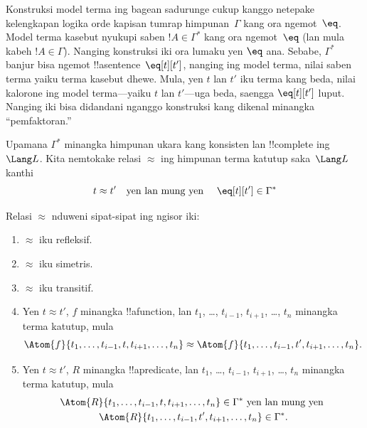 \documentclass[../../../include/open-logic-section]{subfiles}
\begin{document}

\begin{explain}
Konstruksi model terma ing bagean sadurunge cukup kanggo netepake
kelengkapan logika orde kapisan tumrap himpunan~$\Gamma$ kang ora
ngemot~$\eq$. Model terma kasebut nyukupi saben $!A \in \Gamma^*$ kang
ora ngemot~$\eq$ (lan mula kabeh $!A \in \Gamma$). Nanging konstruksi
iki ora lumaku yen $\eq$ ana. Sebabe, $\Gamma^*$ banjur bisa ngemot
!!a{sentence}~$\eq[t][t']$, nanging ing model terma, nilai saben terma
yaiku terma kasebut dhewe. Mula, yen $t$ lan $t'$ iku terma kang beda,
nilai kalorone ing model terma---yaiku $t$ lan $t'$---uga beda, saengga
$\eq[t][t']$ luput. Nanging iki bisa didandani nganggo konstruksi kang
dikenal minangka ``pemfaktoran.''
\end{explain}

\begin{defn}
  Upamana $\Gamma^*$ minangka himpunan ukara kang konsisten lan
  !!{complete} ing~$\Lang L$. Kita nemtokake relasi $\approx$ ing
  himpunan terma katutup saka~$\Lang L$ kanthi
  \[
  t \approx t' \text{\quad yen lan mung yen \quad} \eq[t][t'] \in \Gamma^*
  \]
\end{defn}

\begin{prop}
Relasi $\approx$ nduweni sipat-sipat ing ngisor iki:
\begin{enumerate}
\item $\approx$ iku refleksif.
\item $\approx$ iku simetris.
\item $\approx$ iku transitif.
\item Yen $t \approx t'$, $f$ minangka !!a{function}, lan $t_1$,
  \dots, $t_{i-1}$, $t_{i+1}$, \dots, $t_n$ minangka terma katutup,
  mula
\[
\Atom{f}{t_1,\dots, t_{i-1}, t, t_{i+1}, \dots, t_n} \approx
\Atom{f}{t_1,\dots, t_{i-1}, t', t_{i+1}, \dots, t_n}.
\]
\item Yen $t \approx t'$, $R$ minangka !!a{predicate}, lan $t_1$,
  \dots, $t_{i-1}$, $t_{i+1}$, \dots, $t_n$ minangka terma katutup,
  mula
\begin{multline*}
\Atom{R}{t_1,\dots, t_{i-1}, t, t_{i+1}, \dots, t_n} \in \Gamma^* \text{ yen lan mung yen } \\
\Atom{R}{t_1,\dots, t_{i-1}, t', t_{i+1}, \dots, t_n} \in \Gamma^*.
\end{multline*}
\end{enumerate}
\end{prop}
\end{document}

